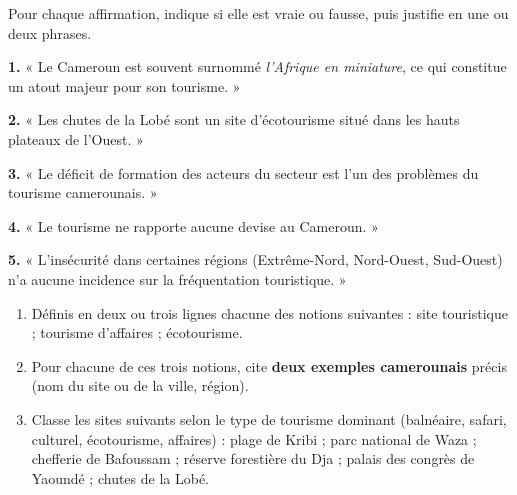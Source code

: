 \documentclass[11pt]{article}
\newcommand{\cle}[1]{{\popxbold\color{popdark}#1}}
\begin{document}
\begin{exercice}
Pour chaque affirmation, indique si elle est vraie ou fausse, puis justifie en une ou deux phrases.

\textbf{1.} « Le Cameroun est souvent surnommé \emph{l'Afrique en miniature}, ce qui constitue un atout majeur pour son tourisme. »

\textbf{2.} « Les chutes de la Lobé sont un site d'écotourisme situé dans les hauts plateaux de l'Ouest. »

\textbf{3.} « Le déficit de formation des acteurs du secteur est l'un des problèmes du tourisme camerounais. »

\textbf{4.} « Le tourisme ne rapporte aucune devise au Cameroun. »

\textbf{5.} « L'insécurité dans certaines régions (Extrême-Nord, Nord-Ouest, Sud-Ouest) n'a aucune incidence sur la fréquentation touristique. »
\end{exercice}

\begin{exercice}
\begin{enumerate}
\item Définis en deux ou trois lignes chacune des notions suivantes : \cle{site touristique} ; \cle{tourisme d'affaires} ; \cle{écotourisme}.
\item Pour chacune de ces trois notions, cite \textbf{deux exemples camerounais} précis (nom du site ou de la ville, région).
\item Classe les sites suivants selon le type de tourisme dominant (balnéaire, safari, culturel, écotourisme, affaires) : plage de Kribi ; parc national de Waza ; chefferie de Bafoussam ; réserve forestière du Dja ; palais des congrès de Yaoundé ; chutes de la Lobé.
\end{enumerate}
\end{exercice}
\end{document}
